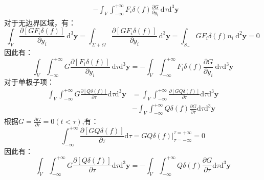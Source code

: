 \begin{enumerate}
\begin{equation}
\begin{aligned}
                &-\int_{V} \int_{-\infty}^{+\infty} F_{i} \delta(f) \frac{\partial G}{\partial y_{i}} \mathrm{~d} \tau \mathrm{d}^{3} \mathbf{y} 
            \end{aligned}
        \end{equation}
        对于无边界区域，有：
        \begin{equation}
            \int_{V} \frac{\partial\left[G F_{i} \delta(f)\right]}{\partial y_{i}} \mathrm{~d}^{3} \mathbf{y}=\int_{\Sigma+\Omega} \frac{\partial\left[G F_{i} \delta(f)\right]}{\partial y_{i}} \mathrm{~d}^{3} \mathbf{y}=\int_{S_{\sim}} G F_{i} \delta(f) n_{i} \mathrm{~d}^{2} \mathbf{y}=0
        \end{equation}
        因此有：
        \begin{equation}
            \int_{V} \int_{-\infty}^{+\infty} G \frac{\partial\left[F_{i} \delta(f)\right]}{\partial y_{i}} \mathrm{~d} \tau \mathrm{d}^{3} \mathbf{y}
            =-\int_{V} \int_{-\infty}^{+\infty} F_{i} \delta(f) \frac{\partial G}{\partial y_{i}} \mathrm{~d} \tau \mathrm{d}^{3} \mathbf{y}
        \end{equation}
        对于单极子项：
        \begin{equation}
            \begin{aligned}
                \int_{V} \int_{-\infty}^{+\infty} G \frac{\partial[Q \delta(f)]}{\partial \tau} \mathrm{d} \tau \mathrm{d}^{3} \mathbf{y} 
                &=\int_{V} \int_{-\infty}^{+\infty} \frac{\partial[G Q \delta(f)]}{\partial \tau} \mathrm{d} \tau \mathrm{d}^{3} \mathbf{y} \\
                &-\int_{V} \int_{-\infty}^{+\infty} Q \delta(f) \frac{\partial G}{\partial \tau} \mathrm{d} \tau \mathrm{d}^{3} \mathbf{y} 
            \end{aligned}
        \end{equation}
        根据\(G=\frac{\partial G}{\partial \tau}=0 (t<\tau) \),有：
        \begin{equation}
            \int_{-\infty}^{+\infty} \frac{\partial[G Q \delta(f)]}{\partial \tau} \mathrm{d} \tau
            =\left.G Q \delta(f)\right|_{\tau=-\infty} ^{\tau=+\infty}
            = 0
        \end{equation}
        因此有：
        \begin{equation}
            \int_{V} \int_{-\infty}^{+\infty} G \frac{\partial[Q \delta(f)]}{\partial \tau} \mathrm{d} \tau \mathrm{d}^{3} \mathbf{y}
            =-\int_{V} \int_{-\infty}^{+\infty} Q \delta(f) \frac{\partial G}{\partial \tau} \mathrm{d} \tau \mathrm{d}^{3} \mathbf{y}

\end{equation}
\end{enumerate}
